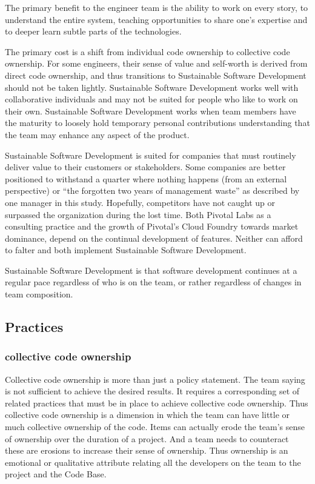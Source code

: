 The primary benefit to the engineer team is the ability to work on every story, to understand the entire system, teaching opportunities to share one's expertise and to deeper learn subtle parts of the technologies. 

The primary cost is a shift from individual code ownership to collective code ownership. For some engineers, their sense of value and self-worth is derived from direct code ownership, and thus transitions to Sustainable Software Development should not be taken lightly. Sustainable Software Development works well with collaborative individuals and may not be suited for people who like to work on their own. Sustainable Software Development works when team members have the maturity to loosely hold temporary personal contributions understanding that the team may enhance any aspect of the product.

Sustainable Software Development is suited for companies that must routinely deliver value to their customers or stakeholders. Some companies are better positioned to withstand a quarter where nothing happens (from an external perspective) or  ``the forgotten two years of management waste” as described by one manager in this study. Hopefully, competitors have not caught up or surpassed the organization during the lost time. Both Pivotal Labs as a consulting practice and the growth of Pivotal's Cloud Foundry towards market dominance, depend on the continual development of features. Neither can afford to falter and both implement Sustainable Software Development.

Sustainable Software Development is that software development continues at a regular pace regardless of who is on the team, or rather regardless of changes in team composition.

\subsection{Practices}
\subsubsection{collective code ownership}
Collective code ownership is more than just a policy statement. The team saying  is not sufficient to achieve the desired results. It requires a corresponding set of related practices that must be in place to achieve collective code ownership. Thus collective code ownership is a dimension in which the team can have little or much collective ownership of the code. Items can actually erode the team's sense of ownership over the duration of a project. And a team needs to counteract these are erosions to increase their sense of ownership. Thus ownership is an emotional or qualitative attribute relating all the developers on the team to the project and the Code Base.

